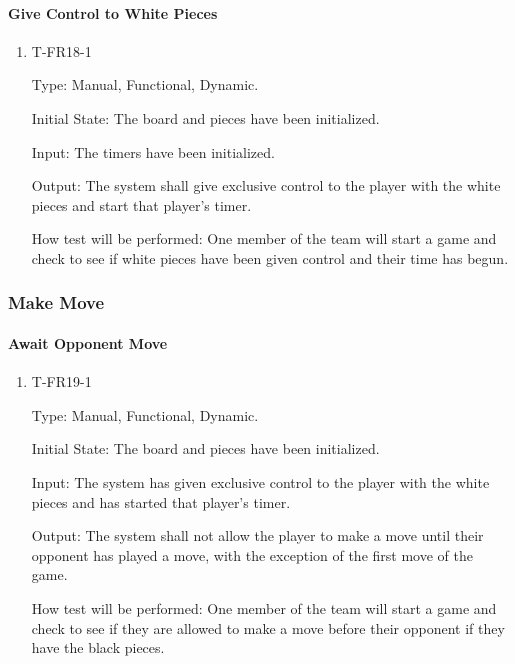 \documentclass[12pt, titlepage]{article}
\begin{document}
    \paragraph{Give Control to White Pieces}

        \begin{enumerate}

        \item{T-FR18-1\\}

            Type: Manual, Functional, Dynamic.
            					
            Initial State: The board and pieces have been initialized.
            					
            Input: The timers have been initialized.
            					
            Output: The system shall give exclusive control to the player with the white pieces and start that player’s timer.

            How test will be performed: One member of the team will start a game and check to see if white pieces have been given control and their time has begun.

        \end{enumerate}

\subsubsection{Make Move}

    \paragraph{Await Opponent Move}

        \begin{enumerate}

        \item{T-FR19-1\\}

            Type: Manual, Functional, Dynamic.
            					
            Initial State: The board and pieces have been initialized.
            					
            Input: The system has given exclusive control to the player with the white pieces and has started that player’s timer.
            					
            Output: The system shall not allow the player to make a move until their opponent has played a move,
            with the exception of the first move of the game.

            How test will be performed: One member of the team will start a game and check to see if they are allowed to make a move before their opponent if they have the black pieces.

        \end{enumerate}
\end{document}
